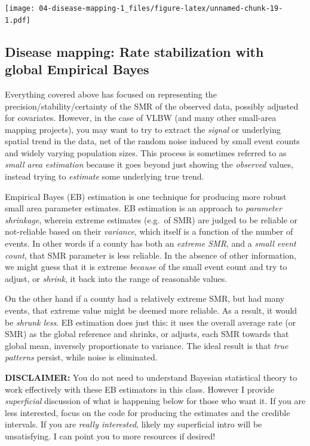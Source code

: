 \documentclass[
]{book}
\newenvironment{rmdcaution}[1]
  {
  \begin{itemize}
  \renewcommand{\labelitemi}{
    \raisebox{-.7\height}[0pt][0pt]{
      {\setkeys{Gin}{width=3em,keepaspectratio}\texttt{[image: images/\#1]}}
    }
  }
  \setlength{\fboxsep}{1em}
  \begin{caution}
  \item
  }
  {
  \end{caution}
  \end{itemize}
  }
\begin{document}
\texttt{[image: 04-disease-mapping-1\_files/figure-latex/unnamed-chunk-19-1.pdf]}

\hypertarget{disease-mapping-rate-stabilization-with-global-empirical-bayes}{%
\subsection{Disease mapping: Rate stabilization with global Empirical Bayes}\label{disease-mapping-rate-stabilization-with-global-empirical-bayes}}

Everything covered above has focused on representing the precision/stability/certainty of the SMR of the observed data, possibly adjusted for covariates. However, in the case of VLBW (and many other small-area mapping projects), you may want to try to extract the \emph{signal} or underlying spatial trend in the data, net of the random noise induced by small event counts and widely varying population sizes. This process is sometimes referred to as \emph{small area estimation} because it goes beyond just showing the \emph{observed} values, instead trying to \emph{estimate} some underlying true trend.

Empirical Bayes (EB) estimation is one technique for producing more robust small area parameter estimates. EB estimation is an approach to \emph{parameter shrinkage}, wherein extreme estimates (e.g.~of SMR) are judged to be reliable or not-reliable based on their \emph{variance}, which itself is a function of the number of events. In other words if a county has both an \emph{extreme SMR}, and a \emph{small event count}, that SMR parameter is less reliable. In the absence of other information, we might guess that it is extreme \emph{because} of the small event count and try to adjust, or \emph{shrink}, it back into the range of reasonable values.

On the other hand if a county had a relatively extreme SMR, but had many events, that extreme value might be deemed more reliable. As a result, it would be \emph{shrunk less}. EB estimation does just this: it uses the overall average rate (or SMR) as the global reference and shrinks, or adjusts, each SMR towards that global mean, inversely proportionate to variance. The ideal result is that \emph{true patterns} persist, while noise is eliminated.

\begin{rmdcaution}{caution}
\textbf{DISCLAIMER:} You do not need to understand Bayesian statistical theory to work effectively with these EB estimators in this class. However I provide \emph{superficial} discussion of what is happening below for those who want it. If you are less interested, focus on the code for producing the estimates and the credible intervals. If you are \emph{really interested}, likely my superficial intro will be unsatisfying. I can point you to more resources if desired!

\end{rmdcaution}
\end{document}
